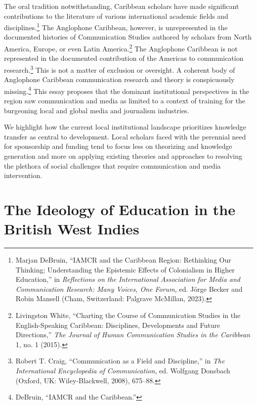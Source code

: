 \documentclass{tufte-handout}
\begin{document}
The oral tradition notwithstanding, Caribbean scholars have made
significant contributions to the literature of various international
academic fields and disciplines.\footnote{Marjan DeBruin, ``IAMCR and
  the Caribbean Region: Rethinking Our Thinking; Understanding the
  Epistemic Effects of Colonialism in Higher Education,'' in
  \emph{Reflections on the International Association for Media and
  Communication Research: Many Voices, One Forum,} ed. Jörge Becker and
  Robin Mansell (Cham, Switzerland: Palgrave McMillan, 2023).} The
Anglophone Caribbean, however, is unrepresented in the documented
histories of Communication Studies authored by scholars from North
America, Europe, or even Latin America.\footnote{Livingston White,
  ``Charting the Course of Communication Studies in the English-Speaking
  Caribbean: Disciplines, Developments and Future Directions,''
  \emph{The Journal of Human Communication Studies in the Caribbean} 1,
  no. 1 (2015).} The Anglophone Caribbean is not represented in the
documented contribution of the Americas to communication
research.\footnote{Robert T. Craig, ``Communication as a Field and
  Discipline,'' in \emph{The International Encyclopedia of
  Communication}, ed. Wolfgang Donsbach (Oxford, UK: Wiley-Blackwell,
  2008), 675­--88.} This is not a matter of exclusion or oversight. A
coherent body of Anglophone Caribbean communication research and theory
is conspicuously missing.\footnote{DeBruin, ``IAMCR and the Caribbean.''}
This essay proposes that the dominant institutional perspectives in the
region saw communication and media as limited to a context of training
for the burgeoning local and global media and journalism industries.

We highlight how the current local institutional landscape prioritizes
knowledge transfer as central to development. Local scholars faced with
the perennial need for sponsorship and funding tend to focus less on
theorizing and knowledge generation and more on applying existing
theories and approaches to resolving the plethora of social challenges
that require communication and media intervention.

\hypertarget{the-ideology-of-education-in-the-british-west-indies}{%
\section{The Ideology of Education in the British West
Indies}\label{the-ideology-of-education-in-the-british-west-indies}}
\end{document}
